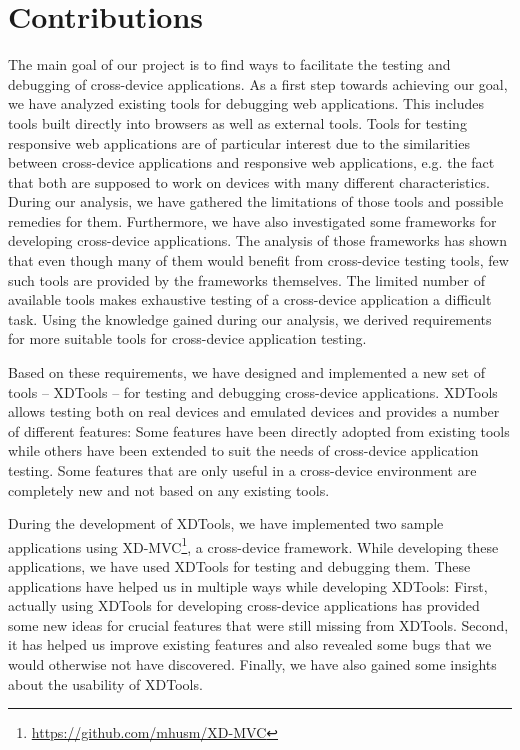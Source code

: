 \section{Contributions}

The main goal of our project is to find ways to facilitate the testing and debugging of cross-device applications. As a first step towards achieving our goal, we have analyzed existing tools for debugging web applications. This includes tools built directly into browsers as well as external tools. Tools for testing responsive web applications are of particular interest due to the similarities between cross-device applications and responsive web applications, e.g. the fact that both are supposed to work on devices with many different characteristics. During our analysis, we have gathered the limitations of those tools and possible remedies for them. Furthermore, we have also investigated some frameworks for developing cross-device applications. The analysis of those frameworks has shown that even though many of them would benefit from cross-device testing tools, few such tools are provided by the frameworks themselves. The limited number of available tools makes exhaustive testing of a cross-device application a difficult task. Using the knowledge gained during our analysis, we derived requirements for more suitable tools for cross-device application testing.

Based on these requirements, we have designed and implemented a new set of tools -- XDTools -- for testing and debugging cross-device applications. XDTools allows testing both on real devices and emulated devices and provides a number of different features: Some features have been directly adopted from existing tools while others have been extended to suit the needs of cross-device application testing. Some features that are only useful in a cross-device environment are completely new and not based on any existing tools.

During the development of XDTools, we have implemented two sample applications using XD-MVC\footnote{\url{https://github.com/mhusm/XD-MVC}}, a cross-device framework. While developing these applications, we have used XDTools for testing and debugging them. These applications have helped us in multiple ways while developing XDTools: First, actually using XDTools for developing cross-device applications has provided some new ideas for crucial features that were still missing from XDTools. Second, it has helped us improve existing features and also revealed some bugs that we would otherwise not have discovered. Finally, we have also gained some insights about the usability of XDTools.

